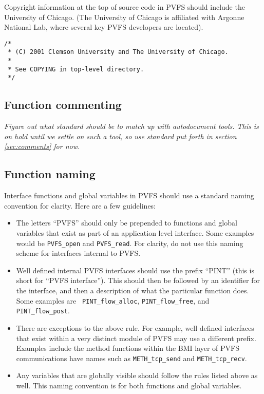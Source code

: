 \documentclass[11pt, letterpaper]{article}
\begin{document}
Copyright information at the top of source code in PVFS should include
the University of Chicago.  (The University of Chicago is affiliated
with Argonne National Lab, where several key PVFS developers are
located).  

\begin{verbatim}
/*
 * (C) 2001 Clemson University and The University of Chicago.
 *
 * See COPYING in top-level directory.
 */       
\end{verbatim}

\subsection{Function commenting}
\label{sec:pvfs-comments}

\emph{Figure out what standard should be to match up with autodocument
tools.  This is on hold until we settle on such a tool, so use standard
put forth in section \ref{sec:comments} for now.}

\subsection{Function naming}
\label{sec:pvfs-naming}

Interface functions and global variables in PVFS should use a standard
naming convention for clarity.  Here are a few guidelines:

\begin{itemize}
\item The letters ``PVFS'' should only be prepended to functions and
global variables that exist as part of an application level interface.
Some examples would be {\tt PVFS\_open} and {\tt PVFS\_read}.  For
clarity, do not use this naming scheme for interfaces internal to PVFS.
\item Well defined internal PVFS interfaces should use the prefix
``PINT'' (this is short for ``PVFS interface'').  This should then be
followed by an identifier for the interface, and then a description of
what the particular function does.  Some examples are {\tt
PINT\_flow\_alloc}, {\tt PINT\_flow\_free}, and {\tt PINT\_flow\_post}.
\item There are exceptions to the above rule.  For example, well defined
interfaces that exist within a very distinct module of PVFS may use a
different prefix.  Examples include the method functions within the BMI
layer of PVFS communications have names such as {\tt METH\_tcp\_send}
and {\tt METH\_tcp\_recv}.
\item Any variables that are globally visible should follow the rules
listed above as well.  This naming convention is for both functions and
global variables.
\end{itemize}
\end{document}
